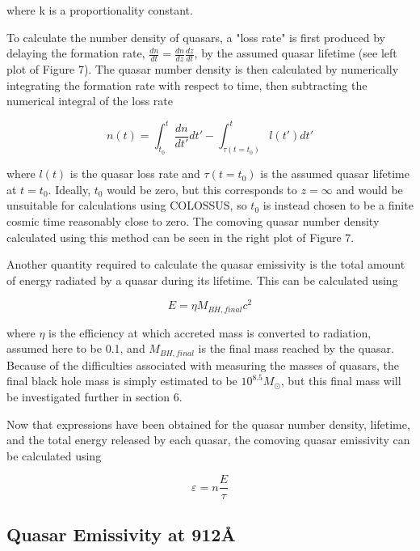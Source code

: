\documentclass[12pt, twocolumn]{report}%
\begin{document}
\noindent where k is a proportionality constant.\par

To calculate the number density of quasars, a "loss rate" is first produced by delaying the formation rate, $\frac{dn}{dt}=\frac{dn}{dz}\frac{dz}{dt}$, by the assumed quasar lifetime (see left plot of Figure 7). The quasar number density is then calculated by numerically integrating the formation rate with respect to time, then subtracting the numerical integral of the loss rate

\begin{equation}
    n(t)=\int_{t_0}^t\frac{dn}{dt'}dt'-\int_{\tau(t=t_0)}^tl(t')dt'
\end{equation}

\noindent where $l(t)$ is the quasar loss rate and $\tau(t=t_0)$ is the assumed quasar lifetime at $t=t_0$. Ideally, $t_0$ would be zero, but this corresponds to $z=\infty$ and would be unsuitable for calculations using COLOSSUS, so $t_0$ is instead chosen to be a finite cosmic time reasonably close to zero. The comoving quasar number density calculated using this method can be seen in the right plot of Figure 7.\par

Another quantity required to calculate the quasar emissivity is the total amount of energy radiated by a quasar during its lifetime. This can be calculated using

\begin{equation}
    E=\eta M_{BH,final}c^2
\end{equation}

\noindent where $\eta$ is the efficiency at which accreted mass is converted to radiation, assumed here to be 0.1, and $M_{BH,final}$ is the final mass reached by the quasar. Because of the difficulties associated with measuring the masses of quasars, the final black hole mass is simply estimated to be $10^{8.5}M_\odot$, but this final mass will be investigated further in section 6.\par

Now that expressions have been obtained for the quasar number density, lifetime, and the total energy released by each quasar, the comoving quasar emissivity can be calculated using

\begin{equation}
    \varepsilon=n\frac{E}{\tau}
\end{equation}

\subsection{Quasar Emissivity at 912\AA}
\end{document}
